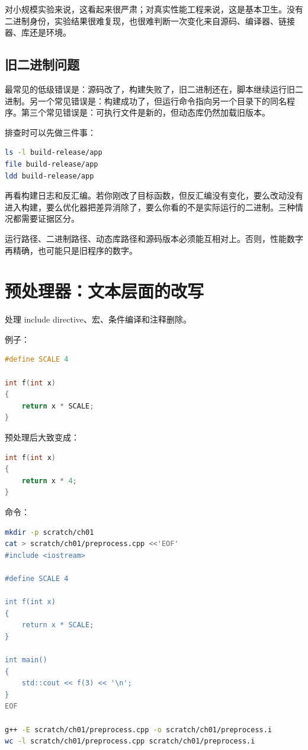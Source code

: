 对小规模实验来说，这看起来很严肃；对真实性能工程来说，这是基本卫生。没有二进制身份，实验结果很难复现，也很难判断一次变化来自源码、编译器、链接器、库还是环境。

\subsection{旧二进制问题}

最常见的低级错误是：源码改了，构建失败了，旧二进制还在，脚本继续运行旧二进制。另一个常见错误是：构建成功了，但运行命令指向另一个目录下的同名程序。第三个常见错误是：可执行文件是新的，但动态库仍然加载旧版本。

排查时可以先做三件事：

\begin{lstlisting}[language=bash]
ls -l build-release/app
file build-release/app
ldd build-release/app
\end{lstlisting}

再看构建日志和反汇编。若你刚改了目标函数，但反汇编没有变化，要么改动没有进入构建，要么优化器把差异消除了，要么你看的不是实际运行的二进制。三种情况都需要证据区分。

\begin{keyidea}
运行路径、二进制路径、动态库路径和源码版本必须能互相对上。否则，性能数字再精确，也可能只是旧程序的数字。
\end{keyidea}

\section{预处理器：文本层面的改写}

 处理 include directive、宏、条件编译和注释删除。

例子：

\begin{lstlisting}[language=C++]
#define SCALE 4

int f(int x)
{
    return x * SCALE;
}
\end{lstlisting}

预处理后大致变成：

\begin{lstlisting}[language=C++]
int f(int x)
{
    return x * 4;
}
\end{lstlisting}

命令：

\begin{lstlisting}[language=bash]
mkdir -p scratch/ch01
cat > scratch/ch01/preprocess.cpp <<'EOF'
#include <iostream>

#define SCALE 4

int f(int x)
{
    return x * SCALE;
}

int main()
{
    std::cout << f(3) << '\n';
}
EOF

g++ -E scratch/ch01/preprocess.cpp -o scratch/ch01/preprocess.i
wc -l scratch/ch01/preprocess.cpp scratch/ch01/preprocess.i
\end{lstlisting}

